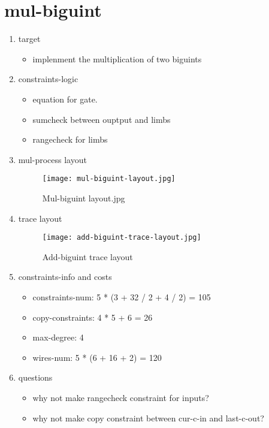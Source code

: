 \section{mul-biguint}
\label{mul-biguint}

\begin{enumerate}
    \item target
        \begin{itemize}
            \item implenment the multiplication of two biguints
        \end{itemize}
    \item constraints-logic
        \begin{itemize}
            \item equation for gate.
            \item sumcheck between ouptput and limbs
            \item rangecheck for limbs
        \end{itemize}
    \item mul-process layout
        \begin{figure}[!ht]
            \centering
            \texttt{[image: mul-biguint-layout.jpg]}
            \caption{Mul-biguint layout.jpg}
            \label{fig:mul-biguint-layout.jpg}
        \end{figure}

    \item trace layout
        \begin{figure}[!ht]
            \centering
            \texttt{[image: add-biguint-trace-layout.jpg]}
            \caption{Add-biguint trace layout}
            \label{fig:add-biguint-trace-layout}
        \end{figure}
    
    \item constraints-info and costs
        \begin{itemize}
            \item constraints-num: 5 * (3 + 32 / 2 + 4 / 2) = 105
            \item copy-constraints: 4 * 5 + 6 = 26
            \item max-degree: 4
            \item wires-num: 5 * (6 + 16 + 2) = 120
        \end{itemize}

    \item questions
        \begin{itemize}
            \item why not make rangecheck constraint for inputs?
            \item why not make copy constraint between cur-c-in and last-c-out?
        
        \end{itemize}

\end{enumerate}